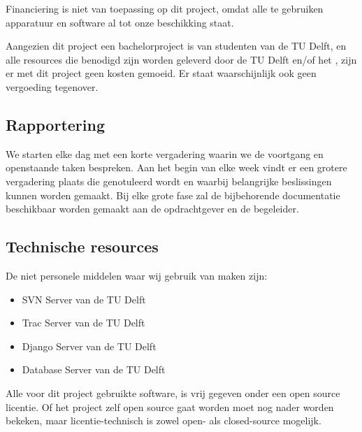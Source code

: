 Financiering is niet van toepassing op dit project, omdat alle te gebruiken apparatuur en software al tot onze beschikking staat.

Aangezien dit project een bachelorproject is van studenten van de TU Delft, en alle resources die benodigd zijn worden geleverd door de TU Delft en/of het \casamproject, zijn er met dit project geen kosten gemoeid. Er staat waarschijnlijk ook geen vergoeding tegenover.

\subsection{Rapportering}

We starten elke dag met een korte vergadering waarin we de voortgang en openstaande taken bespreken. Aan het begin van elke week vindt er een grotere vergadering plaats die genotuleerd wordt en waarbij belangrijke beslissingen kunnen worden gemaakt. Bij elke grote fase zal de bijbehorende documentatie beschikbaar worden gemaakt aan de opdrachtgever en de begeleider.

\subsection{Technische resources}

De niet personele middelen waar wij gebruik van maken zijn:
\begin{itemize}
	\item SVN Server van de TU Delft
	\item Trac Server van de TU Delft
	\item Django Server van de TU Delft
	\item Database Server van de TU Delft
\end{itemize}
Alle voor dit project gebruikte software, is vrij gegeven onder een open source licentie. 
Of het project zelf open source gaat worden moet nog nader worden bekeken,
maar licentie-technisch is zowel open- als closed-source mogelijk.

